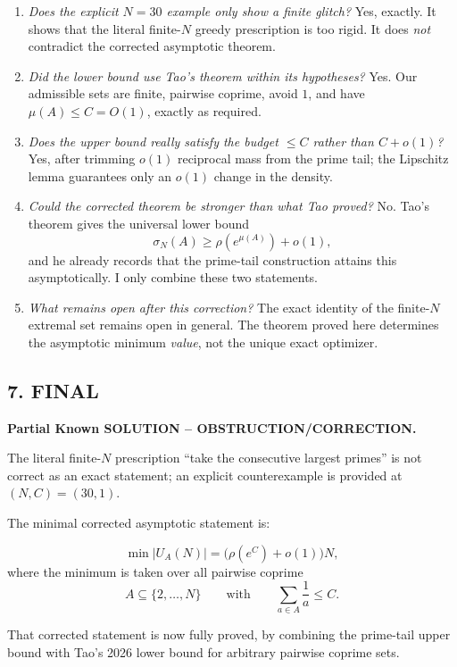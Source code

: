 \begin{enumerate}
\item \emph{Does the explicit $N=30$ example only show a finite glitch?}  
Yes, exactly. It shows that the literal finite-$N$ greedy prescription is too rigid. It does \emph{not} contradict the corrected asymptotic theorem.

\item \emph{Did the lower bound use Tao's theorem within its hypotheses?}  
Yes. Our admissible sets are finite, pairwise coprime, avoid $1$, and have $\mu(A)\leq C=O(1)$, exactly as required.

\item \emph{Does the upper bound really satisfy the budget $\leq C$ rather than $C+o(1)$?}  
Yes, after trimming $o(1)$ reciprocal mass from the prime tail; the Lipschitz lemma guarantees only an $o(1)$ change in the density.

\item \emph{Could the corrected theorem be stronger than what Tao proved?}  
No. Tao's theorem gives the universal lower bound
\[
\sigma_N(A)\geq \rho(e^{\mu(A)})+o(1),
\]
and he already records that the prime-tail construction attains this asymptotically. I only combine these two statements.

\item \emph{What remains open after this correction?}  
The exact identity of the finite-$N$ extremal set remains open in general. The theorem proved here determines the asymptotic minimum \emph{value}, not the unique exact optimizer.
\end{enumerate}

\subsection*{7. FINAL}

\textbf{Partial Known SOLUTION -- OBSTRUCTION/CORRECTION.}

The literal finite-$N$ prescription ``take the consecutive largest primes'' is not correct as an exact statement; an explicit counterexample is provided at $(N,C)=(30,1)$.

The minimal corrected asymptotic statement is:

\[
\min |U_A(N)|=\bigl(\rho(e^C)+o(1)\bigr)N,
\]
where the minimum is taken over all pairwise coprime
\[
A\subseteq\{2,\dots,N\}
\qquad\mbox{with}\qquad
\sum_{a\in A}\frac1a\leq C.
\]

That corrected statement is now fully proved, by combining the prime-tail upper bound with Tao's 2026 lower bound for arbitrary pairwise coprime sets.

